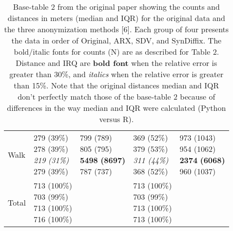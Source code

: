 \documentclass[10pt]{article}
\newcommand{\mycite}[1]{[#1]}
\begin{document}
\begin{table}
\begin{center}
\begin{small}
\begin{tabular}{lllll}
Walk      &  \makecell[l]{\textnormal{279} \textnormal{(39\%)} \\\textnormal{278} \textnormal{(39\%)} \\\textit{219} \textit{(31\%)} \\\textnormal{279} \textnormal{(39\%)} \\}      &  \makecell[l]{\textnormal{799} \textnormal{(789)} \\\textnormal{805} \textnormal{(795)} \\\textbf{5498} \textbf{(8697)} \\\textnormal{787} \textnormal{(737)} \\}      &  \makecell[l]{\textnormal{369} \textnormal{(52\%)} \\\textnormal{379} \textnormal{(53\%)} \\\textit{311} \textit{(44\%)} \\\textnormal{368} \textnormal{(52\%)} \\}      &  \makecell[l]{\textnormal{973} \textnormal{(1043)} \\\textnormal{954} \textnormal{(1062)} \\\textbf{2374} \textbf{(6068)} \\\textnormal{960} \textnormal{(1037)} \\} \\ \cline{2-5}
      Total       & \makecell[l]{713 (100\%) \\703 (99\%) \\713 (100\%) \\716 (100\%) \\} &       & \makecell[l]{713 (100\%) \\703 (99\%) \\713 (100\%) \\713 (100\%) \\} & \\ 

      \bottomrule
      \end{tabular}
      \end{small}
      \caption{Base-table 2 from the original paper showing the counts and distances in meters (median and IQR) for the original data and the three anonymization methods \mycite{6}. Each group of four presents the data in order of Original, ARX, SDV, and SynDiffix. The bold/italic fonts for counts (N) are as described for Table 2. Distance and IRQ are \textbf{bold font} when the relative error is greater than 30\%, and \textit{italics} when the relative error is greater than 15\%.  Note that the original distances median and IQR don't perfectly match those of the base-table 2 because of differences in the way median and IQR were calculated (Python versus R).}
      \label{tab:table2}
      \end{center}
      \end{table}
      \setlength{\fboxsep}{3pt}
    
\end{document}
